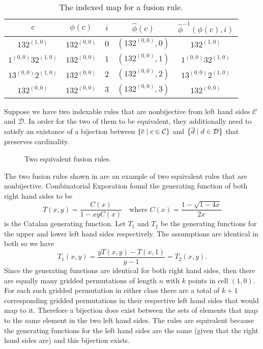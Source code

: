 \begin{table}[ht!]
    \centering
    \begin{tabular}{c|c|c|c|c}
        $c$ & $\phi(c)$ & $i$ & $\hat{\phi}(c)$ & $\hat{\phi}^{-1}(\phi(c),i)$\\
        \hline
        $132^{(1,0)}$ & $132^{(0,0)}$ & $0$ & $\left(132^{(0,0)}, 0\right)$ & $132^{(1,0)}$ \\
        $1^{(0,0)}32^{(1,0)}$ & $132^{(0,0)}$ & $1$ & $\left(132^{(0,0)}, 1\right)$ & $1^{(0,0)}32^{(1,0)}$ \\
        $13^{(0,0)}2^{(1,0)}$ & $132^{(0,0)}$ & $2$ & $\left(132^{(0,0)}, 2\right)$ & $13^{(0,0)}2^{(1,0)}$\\
        $132^{(0,0)}$ & $132^{(0,0)}$ & $3$ & $\left(132^{(0,0)}, 3\right)$ & $132^{(0,0)}$
    \end{tabular}
    \caption{The indexed map for a fusion rule.}
    \label{tab:fuseidxmap}
\end{table}

Suppose we have two indexable rules that are nonbijective from left hand sides $\mathcal{C}$ and $\mathcal{D}$. In order for the two of them to be equivalent, they additionally need to satisfy an existance of a bijection between $\left\{\overline{c} \mid c \in \mathcal{C}\right\}$ and $\left\{\overline{d} \mid d \in \mathcal{D}\right\}$ that preserves cardinality.

\begin{figure}[ht!]
    \centering
    
    \caption{Two equivalent fusion rules.}
    \label{fig:fuseq}
\end{figure}

The two fusion rules shown in  are an example of two equivalent rules that are nonbijective.  Combinatorial Exporation found the generating function of both right hand sides to be
\[
    T(x,y) = \frac{C(x)}{1-xyC(x)}\quad\text{where } C(x) = \frac{1-\sqrt{1-4x}}{2x}
\]
is the Catalan generating function. Let $T_1$ and $T_2$ be the generating functions for the upper and lower left hand sides respectively. The assumptions are identical in both so we have
\[
    T_1(x,y) = \frac{yT(x,y)-T(x,1)}{y-1} = T_2(x,y).
\]
Since the generating functions are identical for both right hand sides, then there are equally many gridded permutations of length $n$ with $k$ points in cell $(1,0)$. For each such gridded permutation in either class there are a total of $k+1$ corresponding gridded permutations in their respective left hand sides that would map to it. Therefore a bijection does exist between the sets of elements that map to the same element in the two left hand sides. The rules are equivalent because the generating functions for the left hand sides are the same (given that the right hand sides are) and this bijection exists.

